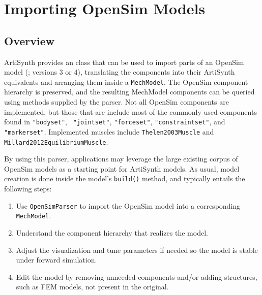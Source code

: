 \ifdefined\maindoc\else
\def\doctitle{Importing OpenSim Models}

\mainmatter
\fi

\chapter{Importing OpenSim Models}
\label{ImportingOpenSim:sec}

\section{Overview}

ArtiSynth provides an  class that can be used
to import parts of an OpenSim model (\cite{delp2007opensim}; versions 3 or 4),
translating the components into their ArtiSynth equivalents and arranging them
inside a {\tt MechModel}. The OpenSim component hierarchy is preserved, and the
resulting MechModel components can be queried using methods supplied by the
parser. Not all OpenSim components are implemented, but those that are include
most of the commonly used components found in {\tt "bodyset"}, {\tt
"jointset"}, {\tt "forceset"}, {\tt "constraintset"}, and {\tt "markerset"}.
Implemented muscles include {\tt Thelen2003Muscle} and {\tt
Millard2012EquilibriumMuscle}.

By using this parser, applications may leverage the large existing corpus of
OpenSim models as a starting point for ArtiSynth models. As usual, model
creation is done inside the model's {\tt build()} method, and typically entails
the following steps:

\begin{enumerate}

\item Use {\tt OpenSimParser} to import the OpenSim model into a corresponding
{\tt MechModel}.

\item Understand the component hierarchy that realizes the model.

\item Adjust the visualization and tune parameters if needed so the model is
stable under forward simulation.

\item Edit the model by removing unneeded components and/or adding
structures, such as FEM models, not present in the original.

\end{enumerate}

